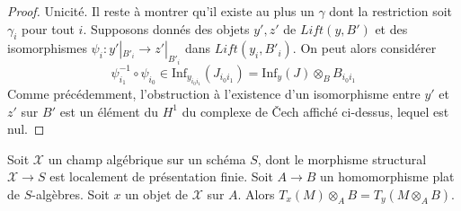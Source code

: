 \begin{proof}
\medskip\noindent
Unicité. Il reste à montrer qu'il existe au plus un $\gamma$ dont la restriction
soit $\gamma_i$ pour tout $i$. Supposons donnés des objets $y', z'$ de
$\textit{Lift}(y, B')$ et des isomorphismes $\psi_i : y'|_{B'_i} \to z'|_{B'_i}$
dans $\textit{Lift}(y_i, B'_i)$. On peut alors considérer
$$
\psi_{i_1}^{-1} \circ \psi_{i_0} \in
\text{Inf}_{y_{i_0i_1}}(J_{i_0i_1}) =
\text{Inf}_y(J) \otimes_B B_{i_0i_1}
$$
Comme précédemment, l'obstruction à l'existence d'un isomorphisme entre
$y'$ et $z'$ sur $B'$ est un élément du $H^1$ du
complexe de {\v C}ech affiché ci-dessus, lequel est nul.
\end{proof}

\begin{lemma}
\label{lemma-T-quasi-coherent}
Soit $\mathcal{X}$ un champ algébrique sur un schéma $S$, dont le
morphisme structural $\mathcal{X} \to S$ est localement de présentation finie.
Soit $A \to B$ un homomorphisme plat de $S$-algèbres.
Soit $x$ un objet de $\mathcal{X}$ sur $A$.
Alors $T_x(M) \otimes_A B = T_y(M \otimes_A B)$.
\end{lemma}

